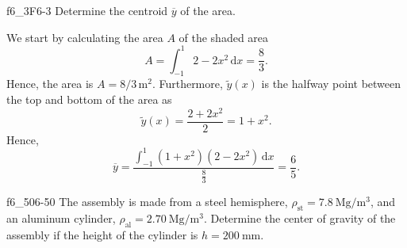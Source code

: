 
\begin{problemwithimage}{f6_3}{F6-3}
  Determine the centroid $\overline{y}$ of the area.
\end{problemwithimage}

\begin{derivation}
  We start by calculating the area $A$ of the shaded area
  \begin{equation*}
    A = \int_{- 1}^{1} 2 - 2x^2 \, \mathrm{d}x  = \frac{8}{3}
  .\end{equation*}
  Hence, the area is $A = 8 / 3 \, \unit{\m^2}$.
  Furthermore, $\tilde{y}(x)$ is the halfway point between the top and bottom of the area as
  \begin{equation*}
    \tilde{y}(x) = \frac{2+2x^2}{2} = 1 + x^2
  .\end{equation*}
  Hence,
  \begin{equation*}
    \overline{y} = \frac{\int_{-1}^{1} (1 + x^2)(2-2x^2) \, \mathrm{d}x}{\frac{8}{3}}  = \frac{6}{5} 
  .\end{equation*}
\end{derivation}


\begin{problemwithimage}{f6_50}{6-50}
  The assembly is made from a steel hemisphere, $\rho_{\mathrm{st}} = \qty{7,8}{\mega\g\per\cubic\m}$, and an aluminum cylinder, $\rho_{\mathrm{al}} = \qty{2,70}{\mega\g\per\cubic\m}$.
  Determine the center of gravity of the assembly if the height of the cylinder is $h = \qty{200}{\mm}$.
\end{problemwithimage}

